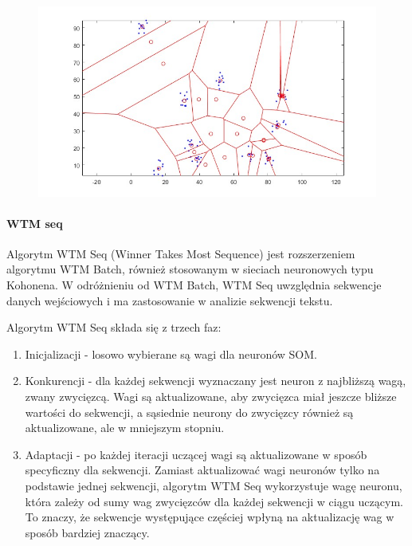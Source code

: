 \documentclass[11pt]{article}
\providecommand{\tightlist}{%
      \setlength{\itemsep}{0pt}\setlength{\parskip}{0pt}}
\begin{document}
\begin{figure}[h!]
  \includegraphics{screeny/WTM_batch/WTM_batch_10_groups/WTM_batch_Areas.jpg}
\end{figure}

\hypertarget{wtm-seq}{%
\paragraph{WTM seq}\label{wtm-seq}}

Algorytm WTM Seq (Winner Takes Most Sequence) jest rozszerzeniem
algorytmu WTM Batch, również stosowanym w sieciach neuronowych typu
Kohonena. W odróżnieniu od WTM Batch, WTM Seq uwzględnia sekwencje
danych wejściowych i ma zastosowanie w analizie sekwencji tekstu.

Algorytm WTM Seq składa się z trzech faz:

\begin{enumerate}
\def\labelenumi{\arabic{enumi}.}
\tightlist
\item
  Inicjalizacji - losowo wybierane są wagi dla neuronów SOM.
\item
  Konkurencji - dla każdej sekwencji wyznaczany jest neuron z najbliższą
  wagą, zwany zwycięzcą. Wagi są aktualizowane, aby zwycięzca miał
  jeszcze bliższe wartości do sekwencji, a sąsiednie neurony do
  zwycięzcy również są aktualizowane, ale w mniejszym stopniu.
\item
  Adaptacji - po każdej iteracji uczącej wagi są aktualizowane w sposób
  specyficzny dla sekwencji. Zamiast aktualizować wagi neuronów tylko na
  podstawie jednej sekwencji, algorytm WTM Seq wykorzystuje wagę
  neuronu, która zależy od sumy wag zwycięzców dla każdej sekwencji w
  ciągu uczącym. To znaczy, że sekwencje występujące częściej wpłyną na
  aktualizację wag w sposób bardziej znaczący.
\end{enumerate}
\end{document}
